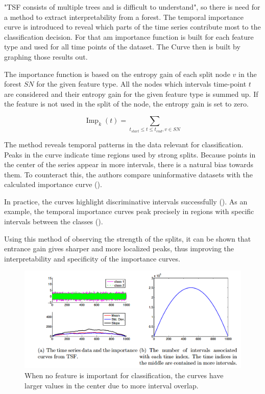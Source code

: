 "TSF consists of multiple trees and is difficult to understand", so 
there is need for a method to extract interpretability from a 
forest. The temporal importance curve is introduced to reveal which parts of the 
time series contribute most to the classification decision. For that am importance function is built for each feature type and
used for all time points of the dataset. The Curve then is built by graphing those results out.

The importance function is based on the entropy gain of each split node $v$ in the forest $SN$ for the given feature type. All the 
nodes which intervals time-point $t$ are considered and their entropy gain for the given feature type is 
summed up. If the feature is not used in the split of the node, the entropy gain is set to zero.

\[
	\operatorname{Imp}_k(t) = \sum_{t_{start} \leq t \leq t_{end}, v \in SN}
\]

The method reveals temporal patterns in the data relevant for classification. Peaks in the curve indicate time regions used by strong splits.
Because points in the center of the series appear in more intervals, there is a natural bias towards them. To counteract this, the authors compare
uninformative datasets with the calculated importance curve ().

In practice, the curves highlight discriminative intervals successfully ().
As an example, the temporal importance curves peak precisely in regions with specific intervals between the classes ().

Using this method of observing the strength of the splits, it can be shown that entrance gain gives sharper and 
more localized peaks, thus improving the interpretability and specificity of the importance curves.

\begin{figure}[h]
\centering
\includegraphics[width=\linewidth]{res/importanceCurvesOne.png}
\caption{When no feature is important for classification, the curves have larger values in the center due to more interval overlap.}
\label{fig:tempOne}
\end{figure}

